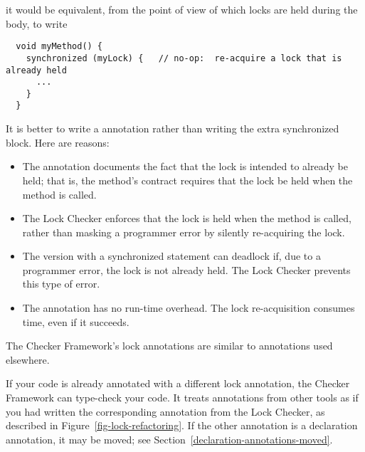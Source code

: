 \noindent
it would be equivalent, from the point of view of which locks are held
during the body, to write

\begin{Verbatim}
  void myMethod() {
    synchronized (myLock) {   // no-op:  re-acquire a lock that is already held
      ...
    }
  }
\end{Verbatim}


It is better to write a  annotation rather than writing the
extra synchronized block.  Here are reasons:

\begin{itemize}
\item
  The annotation documents the fact that the lock is intended to already be
  held;  that is, the method's contract requires that the lock be held when
  the method is called.
\item
  The Lock Checker enforces that the lock is held when the method is
  called, rather than masking a programmer error by silently re-acquiring
  the lock.
\item
  The version with a synchronized statement can deadlock if, due to a programmer error,
  the lock is not already held.  The Lock Checker prevents this type of
  error.
\item
  The annotation has no run-time overhead.  The lock re-acquisition
  consumes time, even if it succeeds.
\end{itemize}



The Checker Framework's lock annotations are similar to annotations used
elsewhere.

If your code is already annotated with a different lock
annotation, the Checker Framework can type-check your code.
It treats annotations from other tools
as if you had written the corresponding annotation from the
Lock Checker, as described in Figure~\ref{fig-lock-refactoring}.
If the other annotation is a declaration annotation, it may be moved; see
Section~\ref{declaration-annotations-moved}.


